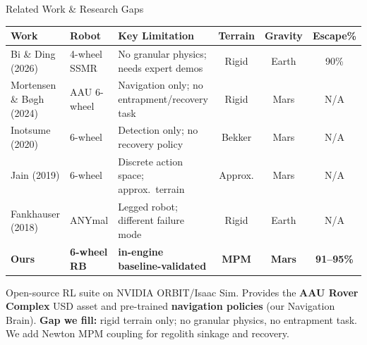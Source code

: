 \documentclass[aspectratio=169, 10pt]{beamer}
\newcommand{\keyword}[1]{\textbf{\color{MarsLight}#1}}
\newcommand{\teal}[1]{{\color{ArcticTeal}#1}}
\begin{document}
\begin{frame}{Related Work \& Research Gaps}
\vspace{0.1em}
{\tiny\setlength{\tabcolsep}{4pt}
\begin{tabularx}{\textwidth}{@{}l l X c c c@{}}
  \toprule
  \rowcolor{MarsRust!10}
  \color{StarWhite}\textbf{Work} &
  \color{StarWhite}\textbf{Robot} &
  \color{StarWhite}\textbf{Key Limitation} &
  \color{StarWhite}\textbf{Terrain} &
  \color{StarWhite}\textbf{Gravity} &
  \color{StarWhite}\textbf{Escape\%} \\
  \midrule
  \rowcolor{CardBg}
  Bi \& Ding (2026) & 4-wheel SSMR & No granular physics; needs expert demos & Rigid & Earth & 90\% \\
  \rowcolor{SlideGray}
  Mortensen \& Bøgh (2024) & AAU 6-wheel & Navigation only; no entrapment/recovery task & Rigid & Mars & N/A \\
  \rowcolor{CardBg}
  Inotsume (2020) & 6-wheel & Detection only; no recovery policy & Bekker & Mars & N/A \\
  \rowcolor{SlideGray}
  Jain (2019) & 6-wheel & Discrete action space; approx.\ terrain & Approx. & Mars & N/A \\
  \rowcolor{CardBg}
  Fankhauser (2018) & ANYmal & Legged robot; different failure mode & Rigid & Earth & N/A \\
  \midrule
  \rowcolor{MarsRust!15}
  \textbf{Ours} & \textbf{6-wheel RB} & \textbf{in-engine baseline-validated} &
    \teal{\textbf{MPM}} & \teal{\textbf{Mars}} & \textbf{91--95\%} \\
  \bottomrule
\end{tabularx}
}

\vspace{0.2em}
\begin{tcolorbox}[mycard, title={\faRobot\; Key Dependency: RLRoverLab (Mortensen \& Bøgh, ISPaRo 2024)}]
  \tiny
  Open-source RL suite on NVIDIA ORBIT/Isaac Sim. Provides the \keyword{AAU Rover Complex} USD asset
  and pre-trained \keyword{navigation policies} (our Navigation Brain).
  \textbf{Gap we fill:} rigid terrain only; no granular physics, no entrapment task.
  We add Newton MPM coupling for regolith sinkage and recovery.
\end{tcolorbox}


\end{frame}
\end{document}
